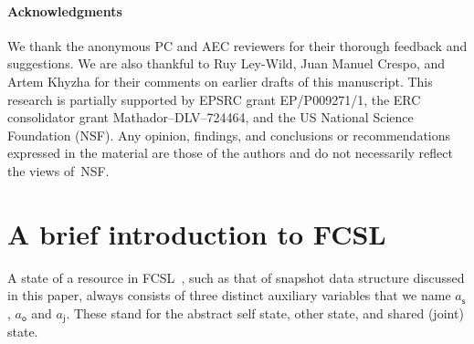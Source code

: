 \documentclass[a4paper,UKenglish]{lipics-v2016}
\newcommand{\lcl}{{\mathsf{s}}}%
\newcommand{\env}{{\mathsf{o}}}%
\newcommand{\joint}{{\mathsf{j}}}%
\theoremstyle{definition}
\begin{document}
\paragraph*{Acknowledgments}%
We thank the anonymous PC and AEC reviewers for their thorough
feedback and suggestions. We are also thankful to Ruy Ley-Wild, Juan
Manuel Crespo, and Artem Khyzha for their comments on earlier drafts
of this manuscript.
%
%
This research is partially supported by EPSRC grant EP/P009271/1, the
ERC consolidator grant Mathador--DLV--724464, and the US National
Science Foundation (NSF). Any opinion, findings, and conclusions or
recommendations expressed in the material are those of the authors and
do not necessarily reflect the views of~NSF.




\appendix

%

\section{A brief introduction to FCSL}
\label{sc:background}

A state of a resource in FCSL~\cite{NanevskiLSD+ESOP14}, such as that
of snapshot data structure discussed in this paper, always consists of
three distinct auxiliary variables that we name $a_\lcl$, $a_\env$ and
$a_\joint$. These stand for the abstract self state, other state, and
shared (joint) state.
\end{document}
